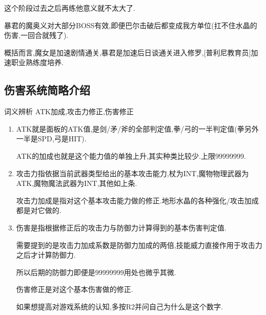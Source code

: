 	这个阶段过去之后再练他意义就不太大了.

	暴君的魔奥义对大部分BOSS有效,即便巴尔击破后都变成我方单位(扛不住水晶的伤害,一回合就残了).

	概括而言,魔女是加速剧情通关,暴君是加速后日谈通关进入修罗,[普利尼教育员]加速职业熟练度培养.

	\subsection{伤害系统简略介绍}

	词义辨析 ATK加成,攻击力修正,伤害修正
	
	\begin{enumerate}
		\item  
		ATK就是面板的ATK值,是剑/矛/斧的全部判定值,拳/弓的一半判定值(拳另外一半是SPD,弓是HIT).

		ATK的加成也就是这个能力值的单独上升,其实种类比较少.上限99999999.

		\item
		攻击力指依据当前武器类型给出的基本攻击能力,杖为INT,魔物物理武器为ATK,魔物魔法武器为INT,其他如上条.

		攻击力加成是指对这个基本攻击能力做的修正.地形水晶的各种强化/攻击加成都是对它做的.

		\item
		伤害是指根据修正后的攻击力与防御力计算得到的基本伤害判定值.

		需要提到的是攻击力加成系数是防御力加成的两倍,技能威力直接作用于攻击力之后才计算防御力.

		所以后期的防御力即便是99999999用处也微乎其微.

		伤害修正是对这个基本伤害做的修正.

	{\color{red}如果想提高对游戏系统的认知,多按R2并问自己为什么是这个数字.}



	
		





	
\end{enumerate}

